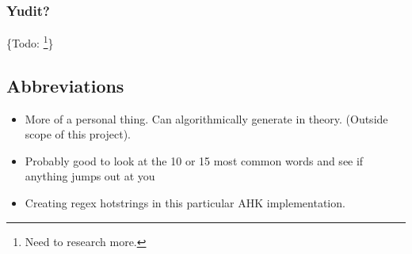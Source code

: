 \documentclass[11pt]{article}
\begin{document}
\subsubsection{Yudit?}
\label{sec:org39188ed}

\{Todo: \footnote{Need to research more.}\}

\subsection{Abbreviations}
\label{sec:org5180b9c}

\begin{itemize}
\item More of a personal thing. Can algorithmically generate in theory. (Outside scope of this project).
\item Probably good to look at the 10 or 15 most common words and see if anything jumps out at you
\item Creating regex hotstrings in this particular AHK implementation.
\end{itemize}
\end{document}
